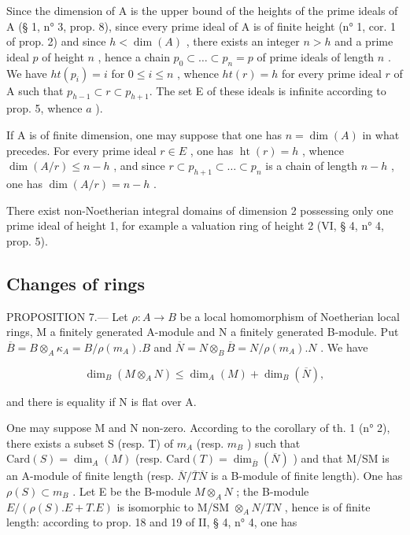 Since the dimension of A is the upper bound of the heights of the prime ideals of A (§ 1, n° 3, prop. 8), since every prime ideal of A is of finite height (n° 1, cor. 1 of prop. 2) and since \(h < \dim(A)\) , there exists an integer \(n > h\) and a prime ideal \(p\) of height \(n\) , hence a chain \(p_0 \subset \ldots \subset p_n = p\) of prime ideals of length \(n\) . We have \(ht(p_i) = i\) for \(0 \leqslant i \leqslant n\) , whence \(ht(r) = h\) for every prime ideal \(r\) of A such that \(p_{h-1} \subset r \subset p_{h+1}\). The set E of these ideals is infinite according to prop. 5, whence \(a\) ).

If A is of finite dimension, one may suppose that one has \(n = \dim(A)\) in what precedes. For every prime ideal \(r \in E\) , one has \(\operatorname{ht}(r) = h\) , whence \(\dim(A/r) \leqslant n - h\) , and since \(r \subset p_{h+1} \subset \ldots \subset p_n\) is a chain of length \(n - h\) , one has \(\dim(A/r) = n - h\) .

There exist non-Noetherian integral domains of dimension 2 possessing only one prime ideal of height 1, for example a valuation ring of height 2 (VI, § 4, n° 4, prop. 5).

\subsection{Changes of rings}

PROPOSITION 7.--- Let \(\rho: A \to B\) be a local homomorphism of Noetherian local rings, M a finitely generated A-module and N a finitely generated B-module. Put \(\overline{B} = B \otimes_A \kappa_A = B / \rho(m_A).B\) and \(\overline{N} = N \otimes_B \overline{B} = N / \rho(m_A).N\) . We have

\[
\dim_ {B} (M \otimes_ {A} N) \leqslant \dim_ {A} (M) + \dim_ {B} (\overline {{N}}),\tag{12}
\]

and there is equality if N is flat over A.

One may suppose M and N non-zero. According to the corollary of th. 1 (n° 2), there exists a subset S (resp. T) of \(m_A\) (resp. \(m_B\) ) such that \(\text{Card}(S) = \dim_A(M)\) (resp. \(\text{Card}(T) = \dim_{\overline{B}}(\overline{N})\) ) and that M/SM is an A-module of finite length (resp. \(\overline{N}/\overline{T}\overline{N}\) is a B-module of finite length). One has \(\rho(S) \subset m_B\) . Let E be the B-module \(M \otimes_A N\) ; the B-module \(E/(\rho(S).E + T.E)\) is isomorphic to M/SM \(\otimes_A N/TN\) , hence is of finite length: according to prop. 18 and 19 of II, § 4, n° 4, one has

